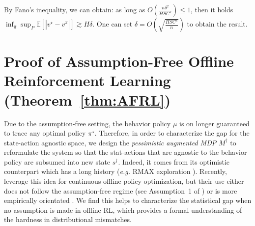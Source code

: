 By Fano's inequality, we can obtain: as long as 
$
O(\frac{n \delta^{2}}{HS C^{\star}}) \leq 1
$, then it holds $\inf _{\hat{\pi}} \sup _{P} \mathbb{E}\left[|v^\star-v^{\widehat{\pi}}|\right] \gtrsim H\delta$. One can set $\delta=O(\sqrt{\frac{HSC^\star}{n}})$ to obtain the result.



\section{Proof of Assumption-Free Offline Reinforcement Learning (Theorem~\ref{thm:AFRL})}\label{sec:proof_af}

Due to the assumption-free setting, the behavior policy $\mu$ is on longer guaranteed to trace any optimal policy $\pi^\star$. Therefore, in order to characterize the gap for the state-action agnostic space, we design the \emph{pessimistic augmented MDP} $M^\dagger$ to reformulate the system so that the stat-actions that are agnostic to the behavior policy are subsumed into new state $s^\dagger$. Indeed, it comes from its optimistic counterpart which has a long history (\emph{e.g.} RMAX exploration \cite{brafman2002r,jung2010gaussian}). Recently, \cite{liu2019off,kidambi2020morel,buckman2020importance} leverage this idea for continuous offline policy optimization, but their use either does not follow the assumption-free regime (see Assumption~1 of \cite{liu2019off}) or is more empirically orientated \citep{buckman2020importance,kidambi2020morel}. We find this helps to characterize the statistical gap when no assumption is made in offline RL, which provides a formal understanding of the hardness in distributional mismatches.


